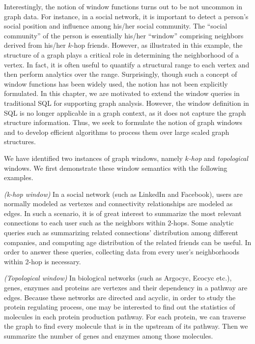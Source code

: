 Interestingly, the notion of window functions turns out to be not uncommon
in graph data. For instance, in a social network, it is important to detect 
a person's social position and influence among his/her social community. 
The ``social community'' of the person is essentially his/her ``window'' 
comprising neighbors derived from his/her $k$-hop friends.
However, as illustrated in this example, the structure of a graph
plays a critical role in determining the neighborhood of a vertex.
In fact, it is often useful to quantify a structural range to each vertex 
and then perform analytics over the range. 
Surprisingly, though such a concept of window functions has been widely
used, the notion has not been explicitly formulated. 
In this chapter, we are motivated to extend the window queries in traditional 
SQL for supporting graph analysis. However, the window definition in 
SQL is no longer applicable in a graph context, as it does not capture 
the graph structure information.
Thus, we seek to formulate the notion of graph windows and to develop
efficient algorithms to process them over large scaled graph structures. 

We have identified two instances of graph windows, namely 
{\em $k$-hop} and {\em topological} windows. 
We first demonstrate these window semantics with the following examples. 
\begin{example}
\label{query:linkedin-2-hop-window}
\emph{(k-hop window)} In a social network (such as LinkedIn and Facebook), users are normally modeled as vertexes and connectivity relationships are modeled as edges. In such a scenario, it is of great interest to summarize the most relevant connections to each user such as the neighbors within 2-hops. Some analytic queries such as summarizing
related connections' distribution among different companies, and computing age distribution of the related friends can be useful. In order to answer these queries, collecting data from every user's neighborhoods within 2-hop is necessary.
\end{example}

\begin{example}
\label{query:bio-dag-window}
\emph{(Topological window)} In biological networks (such as Argocyc, Ecocyc etc.\cite{keseler2005ecocyc}), genes, enzymes and proteins are vertexes and their dependency in a pathway are edges. Because these networks are directed 
and acyclic, in order to study the protein regulating process, one may be 
interested to find out the statistics of molecules in each protein 
production pathway. For each protein, we can traverse the graph to find 
every molecule that is in the upstream of its pathway. Then we summarize the number of genes and enzymes among those molecules. 
\end{example}

